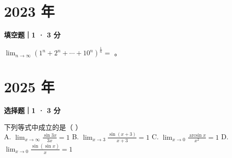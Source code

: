 \section*{2023 年}


\textbf{填空题｜1 · 3 分}

$\lim_{n \to \infty} (1^n + 2^n + \cdots + 10^n)^{\frac{1}{n}} = $ \underline{\hspace{3cm}}。


\section*{2025 年}


\textbf{选择题｜1 · 3 分}

下列等式中成立的是（ \quad ）\\
A. $\lim_{x \to \infty} \frac{\sin 3x}{3x} = 1$ \quad B. $\lim_{x \to 3} \frac{\sin(x+3)}{x+3} = 1$ \quad C. $\lim_{x \to 0} \frac{\arcsin x}{x^2} = 1$ \quad D. $\lim_{x \to 0} \frac{\sin(\sin x)}{x} = 1$
